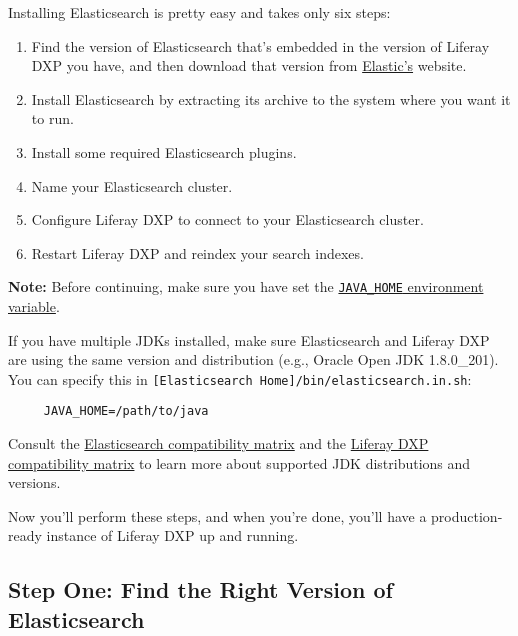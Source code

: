 Installing Elasticsearch is pretty easy and takes only six steps:

\begin{enumerate}
\def\labelenumi{\arabic{enumi}.}
\item
  Find the version of Elasticsearch that's embedded in the version of
  Liferay DXP you have, and then download that version from
  \href{https://www.elastic.co}{Elastic's} website.
\item
  Install Elasticsearch by extracting its archive to the system where
  you want it to run.
\item
  Install some required Elasticsearch plugins.
\item
  Name your Elasticsearch cluster.
\item
  Configure Liferay DXP to connect to your Elasticsearch cluster.
\item
  Restart Liferay DXP and reindex your search indexes.
\end{enumerate}

\noindent\hrulefill

\textbf{Note:} Before continuing, make sure you have set the
\href{https://docs.oracle.com/cd/E19182-01/820-7851/inst_cli_jdk_javahome_t/}{\texttt{JAVA\_HOME}
environment variable}.

If you have multiple JDKs installed, make sure Elasticsearch and Liferay
DXP are using the same version and distribution (e.g., Oracle Open JDK
1.8.0\_201). You can specify this in
\texttt{{[}Elasticsearch\ Home{]}/bin/elasticsearch.in.sh}:

\begin{verbatim}
     JAVA_HOME=/path/to/java
\end{verbatim}

Consult the
\href{https://www.elastic.co/support/matrix\#matrix_jvm}{Elasticsearch
compatibility matrix} and the
\href{https://help.liferay.com/hc/en-us/articles/360016285432-Liferay-DXP-7-1-Compatibility-Matrix}{Liferay
DXP compatibility matrix} to learn more about supported JDK
distributions and versions.

\noindent\hrulefill

Now you'll perform these steps, and when you're done, you'll have a
production-ready instance of Liferay DXP up and running.

\subsection{Step One: Find the Right Version of
Elasticsearch}\label{step-one-find-the-right-version-of-elasticsearch-1}

